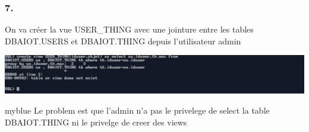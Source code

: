 \subsubsection*{7.}
On va créer la vue USER\_THING avec une jointure entre les tables DBAIOT.USERS et DBAIOT.THING depuis l'utilisateur admin



\begin{center}
    \includegraphics[width=\textwidth]{ScreenShot/Partie4/createView.png}
\end{center}

\begin{prettyBox}{}{myblue}
Le problem est que l'admin n'a pas le privelege de select la table DBAIOT.THING ni le privelge de creer des views
\end{prettyBox}
